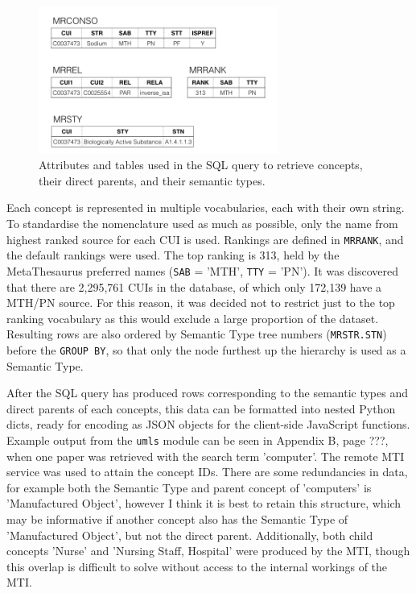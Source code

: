 \documentclass[Report.tex]{subfiles}
\begin{document}
\begin{figure}[h!]
\begin{center}
\includegraphics[width=0.7\textwidth]{../lib/images/db.png}
\caption{Attributes and tables used in the SQL query to retrieve concepts, their direct parents, and their semantic types.}
\label{fig:db}
\end{center}
\end{figure}

\noindent Each concept is represented in multiple vocabularies, each with their own string. To standardise the nomenclature used as much as possible, only the name from highest ranked source for each CUI is used. Rankings are defined in \texttt{MRRANK}, and the default rankings were used. The top ranking is 313, held by the MetaThesaurus preferred names (\texttt{SAB} = 'MTH', \texttt{TTY} = 'PN'). It was discovered that there are 2,295,761 CUIs in the database, of which only 172,139 have a MTH/PN source. For this reason, it was decided not to restrict just to the top ranking vocabulary as this would exclude a large proportion of the dataset. Resulting rows are also ordered by Semantic Type tree numbers (\texttt{MRSTR.STN}) before the \texttt{GROUP BY}, so that only the node furthest up the hierarchy is used as a Semantic Type.\newline

\noindent After the SQL query has produced rows corresponding to the semantic types and direct parents of each concepts, this data can be formatted into nested Python dicts, ready for encoding as JSON objects for the client-side JavaScript functions. Example output from the \texttt{umls} module can be seen in Appendix B, page ???, when one paper was retrieved with the search term 'computer'. The remote MTI service was used to attain the concept IDs. There are some redundancies in data, for example both the Semantic Type and parent concept of 'computers' is 'Manufactured Object', however I think it is best to retain this structure, which may be informative if another concept also has the Semantic Type of 'Manufactured Object', but not the direct parent. Additionally, both child concepts 'Nurse' and 'Nursing Staff, Hospital' were produced by the MTI, though this overlap is difficult to solve without access to the internal workings of the MTI.
\end{document}
